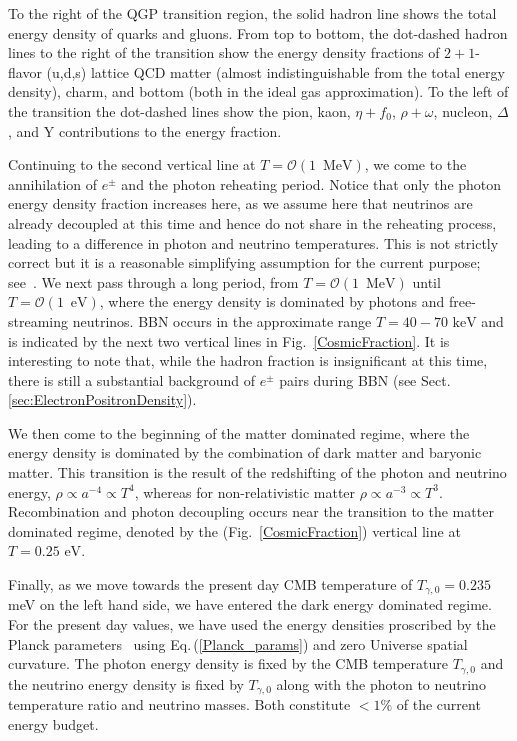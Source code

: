 \documentclass[universe,article,submit,moreauthors,pdftex,a4paper]{Definitions/mdpi}
\newcommand{\MeV}{\text{ MeV}}
\newcommand{\keV}{\text{ keV}}
\newcommand{\eV}{\text{ eV}}
\newcommand{\req}[1]{Eq.\,(\ref{#1})}
\newcommand*{\rf}[1]{Fig.~{\ref{#1}}}
\newcommand*{\rsec}[1]{Sect.\,{\ref{#1}}}
\begin{document}
To the right of the QGP transition region, the solid hadron line shows the total energy density of quarks and gluons. From top to bottom, the dot-dashed hadron lines to the right of the transition show the energy density fractions of $2+1$-flavor (u,d,s) lattice QCD matter (almost indistinguishable from the total energy density), charm, and bottom (both in the ideal gas approximation). To the left of the transition the dot-dashed lines show the pion, kaon, $\eta+f_0$, $\rho+\omega$, nucleon, $\Delta$, and Y contributions to the energy fraction.

Continuing to the second vertical line at $T=\mathcal{O}(1\, \MeV)$, we come to the annihilation of $e^\pm$ and the photon reheating period. Notice that only the photon energy density fraction increases here, as we assume here that neutrinos are already decoupled at this time and hence do not share in the reheating process, leading to a difference in photon and neutrino temperatures. This is not strictly correct but it is a reasonable simplifying assumption for the current purpose; see~\cite{Mangano:2005cc,Fornengo:1997wa,Mangano:2001iu,Birrell:2012gg}. We next pass through a long period, from $T=\mathcal{O}(1\, \MeV)$ until $T=\mathcal{O}(1\, \eV)$, where the energy density is dominated by photons and free-streaming neutrinos. BBN occurs in the approximate range $T=40-70\keV$ and is indicated by the next two vertical lines in \rf{CosmicFraction}. It is interesting to note that, while the hadron fraction is insignificant at this time, there is still a substantial background of $e^\pm$ pairs during BBN (see \rsec{sec:ElectronPositronDensity}). 

We then come to the beginning of the matter dominated regime, where the energy density is dominated by the combination of dark matter and baryonic matter. This transition is the result of the redshifting of the photon and neutrino energy, $\rho\propto a^{-4} \propto T^4$, whereas for non-relativistic matter $\rho\propto a^{-3}\propto T^3$. Recombination and photon decoupling occurs near the transition to the matter dominated regime, denoted by the (\rf{CosmicFraction}) vertical line at $T=0.25\eV$.

Finally, as we move towards the present day CMB temperature of $T_{\gamma,0}=0.235$ meV on the left hand side, we have entered the dark energy dominated regime. For the present day values, we have used the energy densities proscribed by the Planck parameters~\cite{Planck:2013pxb} using \req{Planck_params} and zero Universe spatial curvature. The photon energy density is fixed by the CMB temperature $T_{\gamma,0}$ and the neutrino energy density is fixed by $T_{\gamma,0}$ along with the photon to neutrino temperature ratio and neutrino masses. Both constitute $<1\%$ of the current energy budget.
\end{document}
